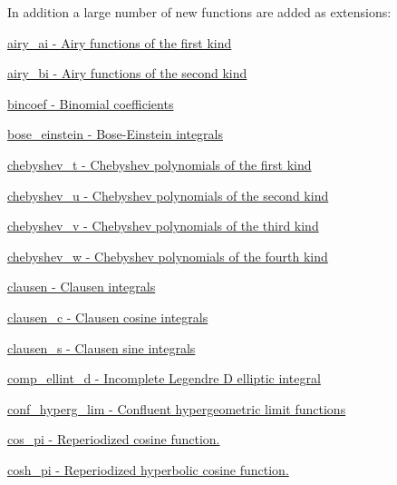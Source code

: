In addition a large number of new functions are added as extensions\+:
\begin{DoxyItemize}
\item \hyperlink{group__gnu__math__spec__func_ga53243cdb83abeb008fa90d8a098768af}{airy\+\_\+ai -\/ Airy functions of the first kind}
\item \hyperlink{group__gnu__math__spec__func_ga812ca309bff1b0ae2bbe1183a0bc47d5}{airy\+\_\+bi -\/ Airy functions of the second kind}
\item \hyperlink{group__gnu__math__spec__func_ga2934ccfb8bbd5877efd369a3ecd9ac4d}{bincoef -\/ Binomial coefficients}
\item \hyperlink{group__gnu__math__spec__func_gacf63ebbc67ea21d569cf510ed0da95fd}{bose\+\_\+einstein -\/ Bose-\/\+Einstein integrals}
\item \hyperlink{group__gnu__math__spec__func_gae35c0bc63248e3bcdb9b490477975eb4}{chebyshev\+\_\+t -\/ Chebyshev polynomials of the first kind}
\item \hyperlink{group__gnu__math__spec__func_gaea7ea830fe6be79ca84fba1bb94691a4}{chebyshev\+\_\+u -\/ Chebyshev polynomials of the second kind}
\item \hyperlink{group__gnu__math__spec__func_ga674e3d97204a74620eb0d408873aefb9}{chebyshev\+\_\+v -\/ Chebyshev polynomials of the third kind}
\item \hyperlink{group__gnu__math__spec__func_ga55ebf3cda76302bc6e0f173fc1c1425e}{chebyshev\+\_\+w -\/ Chebyshev polynomials of the fourth kind}
\item \hyperlink{group__gnu__math__spec__func_ga7959ce3dea7f8d98b1dfee5715303f1c}{clausen -\/ Clausen integrals}
\item \hyperlink{group__gnu__math__spec__func_gabbdae75b253a0b19e8ae3d42c14f6be3}{clausen\+\_\+c -\/ Clausen cosine integrals}
\item \hyperlink{group__gnu__math__spec__func_ga3ed0e444799410cda76ccbc62181ce0c}{clausen\+\_\+s -\/ Clausen sine integrals}
\item \hyperlink{group__gnu__math__spec__func_ga2c6b6c5a44ea00f0aed05c02f1072c31}{comp\+\_\+ellint\+\_\+d -\/ Incomplete Legendre D elliptic integral}
\item \hyperlink{group__gnu__math__spec__func_gab923b5a9e67469a5145d7bfcb20b3396}{conf\+\_\+hyperg\+\_\+lim -\/ Confluent hypergeometric limit functions}
\item \hyperlink{group__gnu__math__spec__func_ga05f183d57b1726136ba9795ba1b158c5}{cos\+\_\+pi -\/ Reperiodized cosine function.}
\item \hyperlink{group__gnu__math__spec__func_ga633224563637e80a4cda93863a693ad6}{cosh\+\_\+pi -\/ Reperiodized hyperbolic cosine function.}

\end{DoxyItemize}
